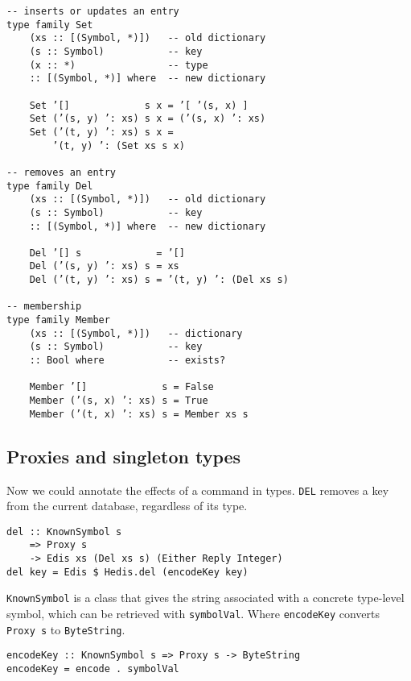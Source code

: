 \documentclass[pldi]{sigplanconf-pldi16}
\begin{document}
\begin{verbatim}
-- inserts or updates an entry
type family Set
    (xs :: [(Symbol, *)])   -- old dictionary
    (s :: Symbol)           -- key
    (x :: *)                -- type
    :: [(Symbol, *)] where  -- new dictionary

    Set ’[]             s x = ’[ ’(s, x) ]
    Set (’(s, y) ’: xs) s x = (’(s, x) ’: xs)
    Set (’(t, y) ’: xs) s x =
        ’(t, y) ’: (Set xs s x)

-- removes an entry
type family Del
    (xs :: [(Symbol, *)])   -- old dictionary
    (s :: Symbol)           -- key
    :: [(Symbol, *)] where  -- new dictionary

    Del ’[] s             = ’[]
    Del (’(s, y) ’: xs) s = xs
    Del (’(t, y) ’: xs) s = ’(t, y) ’: (Del xs s)

-- membership
type family Member
    (xs :: [(Symbol, *)])   -- dictionary
    (s :: Symbol)           -- key
    :: Bool where           -- exists?

    Member ’[]             s = False
    Member (’(s, x) ’: xs) s = True
    Member (’(t, x) ’: xs) s = Member xs s
\end{verbatim}

\subsection{Proxies and singleton types}

Now we could annotate the effects of a command in types. \texttt{DEL}
 removes a key from the current database, regardless of its type.

\begin{verbatim}
del :: KnownSymbol s
    => Proxy s
    -> Edis xs (Del xs s) (Either Reply Integer)
del key = Edis $ Hedis.del (encodeKey key)
\end{verbatim}

\texttt{KnownSymbol} is a class that gives the string associated
 with a concrete type-level symbol, which can be retrieved with
 \texttt{symbolVal}.\footnotemark
 Where \texttt{encodeKey} converts \texttt{Proxy s} to
 \texttt{ByteString}.

\begin{verbatim}
encodeKey :: KnownSymbol s => Proxy s -> ByteString
encodeKey = encode . symbolVal
\end{verbatim}
\end{document}
